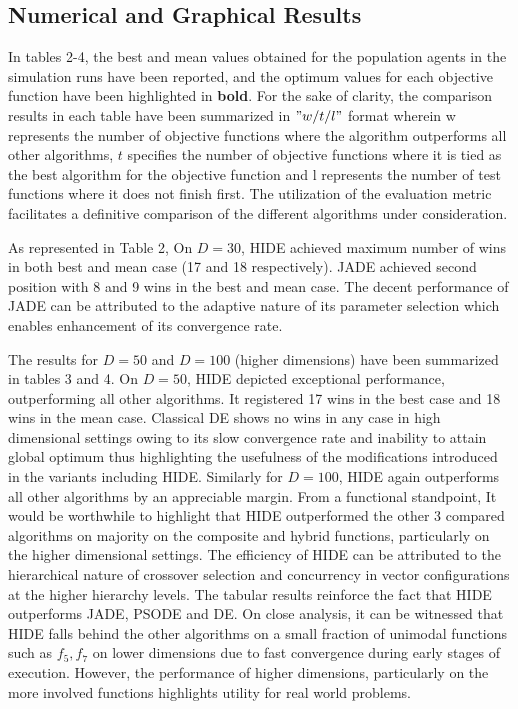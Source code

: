 \documentclass[a4paper,twoside]{article}
\begin{document}
\subsection{Numerical and Graphical Results} 
In tables 2-4, the best and mean values obtained for the population agents in the simulation runs have been reported, and the optimum values for each objective function have been highlighted in \textbf{bold}. For the sake of clarity, the comparison results in each table have been summarized in $"w/t/l"$ format wherein w represents the number of objective functions where the algorithm outperforms all other algorithms, $t$ specifies the number of objective functions where it is tied as the best algorithm for the objective function and l represents the number of test functions where it does not finish first. The utilization of the evaluation metric facilitates a definitive comparison of the different algorithms under consideration.
 
As represented in Table 2, On $D = 30$, HIDE achieved maximum number of wins in both best and mean case (17 and 18 respectively). JADE achieved second position with 8 and 9 wins in the best and mean case. The decent performance of JADE can be attributed to the adaptive nature of its parameter selection which enables enhancement of its convergence rate.

The results for $D = 50$ and $D = 100$ (higher dimensions) have been summarized in tables 3 and 4. On $D = 50$, HIDE depicted exceptional performance, outperforming all other algorithms. It registered 17 wins in the best case and 18 wins in the mean case. Classical DE shows no wins in any case in high dimensional settings owing to its slow convergence rate and inability to attain global optimum thus highlighting the usefulness of the modifications introduced in the variants including HIDE. Similarly for $D = 100$, HIDE again outperforms all other algorithms by an appreciable margin.
From a functional standpoint, It would be worthwhile to highlight that HIDE outperformed the other 3 compared algorithms on majority on the composite and hybrid functions, particularly on the higher dimensional settings. The efficiency of HIDE can be attributed to the hierarchical nature of crossover selection and concurrency in vector configurations at the higher hierarchy levels.
The tabular results reinforce the fact that HIDE outperforms JADE, PSODE and DE. On close analysis, it can be witnessed that HIDE falls behind the other algorithms on a small fraction of unimodal functions such as $f_5, f_7$ on lower dimensions due to fast convergence during early stages of execution. However, the performance of higher dimensions, particularly on the more involved functions highlights utility for real world problems.
\end{document}
